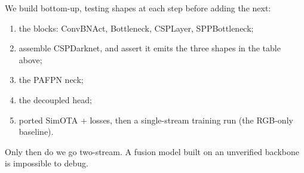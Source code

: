 \documentclass[../main.tex]{subfiles}
\begin{document}
We build bottom-up, testing shapes at each step before adding the next:
\begin{enumerate}
  \item the blocks: ConvBNAct, Bottleneck, CSPLayer, SPPBottleneck;
  \item assemble CSPDarknet, and assert it emits the three shapes in the table above;
  \item the PAFPN neck;
  \item the decoupled head;
  \item ported SimOTA + losses, then a single-stream training run (the RGB-only baseline).
\end{enumerate}
Only then do we go two-stream. A fusion model built on an unverified backbone is impossible to
debug.
\end{document}
